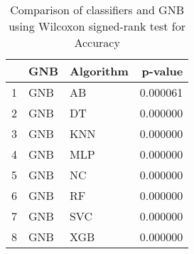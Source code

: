 \begin{table}
\footnotesize
\caption{Comparison of classifiers and GNB using Wilcoxon signed-rank test for Accuracy}
\label{tab:GNB wilcoxon Accuracy comparison}
\begin{tabular}{lllr}
\hline
 & GNB & Algorithm & p-value \\
\hline
1 & GNB & AB & 0.000061 \\
2 & GNB & DT & 0.000000 \\
3 & GNB & KNN & 0.000000 \\
4 & GNB & MLP & 0.000000 \\
5 & GNB & NC & 0.000000 \\
6 & GNB & RF & 0.000000 \\
7 & GNB & SVC & 0.000000 \\
8 & GNB & XGB & 0.000000 \\
\hline
\end{tabular}
\end{table}
